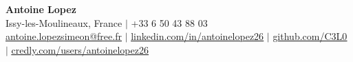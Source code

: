 \documentclass[letterpaper,10pt]{article}
\begin{document}
\begin{center}
    {\Huge \textbf{Antoine Lopez}} \\ \vspace{4pt}
    \small
    Issy-les-Moulineaux, France $|$ +33 6 50 43 88 03 \\
    \href{mailto:antoine.lopezsimeon@free.fr}{\underline{antoine.lopezsimeon@free.fr}} $|$ 
    \href{https://linkedin.com/in/antoinelopez26}{\underline{linkedin.com/in/antoinelopez26}} $|$
    \href{https://github.com/C3L0}{\underline{github.com/C3L0}} $|$
    \href{https://www.credly.com/users/antoinelopez26}{\underline{credly.com/users/antoinelopez26}}
\end{center}

\vspace{-10pt}







\end{document}
